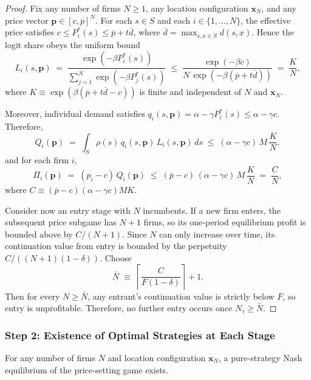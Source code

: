 \documentclass{article}
\begin{document}
\begin{proof}
  Fix any number of firms $N\ge 1$, any location configuration $\mathbf{x}_N$, and any price vector $\mathbf{p}\in[c,\overline{p}]^N$.
  For each $s\in S$ and each $i\in\{1,\ldots,N\}$, the effective price satisfies
  $c \le P_i^*(s) \le \overline{p} + t\overline{d}$, where $\overline{d}=\max_{s,x\in S} d(s,x)$.
  Hence the logit share obeys the uniform bound
  \[
    L_i(s,\mathbf{p})
    \;=\;
    \frac{\exp(-\beta P_i^*(s))}{\sum_{j=1}^N \exp(-\beta P_j^*(s))}
    \;\le\;
    \frac{\exp(-\beta c)}{N\,\exp(-\beta(\overline{p}+t\overline{d}))}
    \;=\;
    \frac{K}{N},
  \]
  where $K\equiv \exp(\beta(\overline{p}+t\overline{d}-c))$ is finite and independent of $N$ and $\mathbf{x}_N$.

  Moreover, individual demand satisfies $q_i(s,\mathbf{p})=\alpha-\gamma P_i^*(s)\le \alpha-\gamma c$.
  Therefore,
  \[
    Q_i(\mathbf{p})
    \;=\;
    \int_S \rho(s)\,q_i(s,\mathbf{p})\,L_i(s,\mathbf{p})\,ds
    \;\le\;
    (\alpha-\gamma c)\,M\,\frac{K}{N},
  \]
  and for each firm $i$,
  \[
    \Pi_i(\mathbf{p})
    \;=\;
    (p_i-c)\,Q_i(\mathbf{p})
    \;\le\;
    (\overline{p}-c)\,(\alpha-\gamma c)\,M\,\frac{K}{N}
    \;=\;
    \frac{C}{N},
  \]
  where $C\equiv (\overline{p}-c)(\alpha-\gamma c)MK$.

  Consider now an entry stage with $N$ incumbents. If a new firm enters, the subsequent price subgame has $N+1$ firms, so its one-period equilibrium profit is bounded above by $C/(N+1)$.
  Since $N$ can only increase over time, its continuation value from entry is bounded by the perpetuity $C/((N+1)(1-\delta))$.
  Choose
  \[
    \bar{N}
    \;\equiv\;
    \left\lceil \frac{C}{F(1-\delta)} \right\rceil + 1.
  \]
  Then for every $N\ge \bar{N}$, any entrant's continuation value is strictly below $F$, so entry is unprofitable. Therefore, no further entry occurs once $N_\tau\ge \bar{N}$.
\end{proof}

\subsubsection*{Step 2: Existence of Optimal Strategies at Each Stage}

\begin{lemma}
  For any number of firms $N$ and location configuration $\mathbf{x}_N$, a pure-strategy Nash equilibrium of the price-setting game exists.
\end{lemma}
\end{document}
